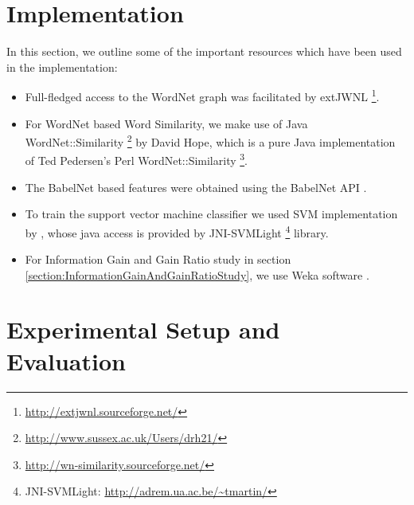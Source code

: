\section{Implementation}
In this section, we outline some of the important resources which have been used in the implementation: 
\begin{itemize}
\item Full-fledged access to the WordNet graph was facilitated by extJWNL \footnote{\url{http://extjwnl.sourceforge.net/}}.

\item For WordNet based Word Similarity, we make use of Java WordNet::Similarity \footnote{\url{http://www.sussex.ac.uk/Users/drh21/}} by David Hope, which is a pure Java implementation of Ted Pedersen's Perl WordNet::Similarity \footnote{\url{http://wn-similarity.sourceforge.net/}}.

\item The BabelNet based features were obtained using the BabelNet API \citep{NavigliPonzetto:2012acl}.

\item To train the support vector machine classifier we used SVM implementation by \citep{Joachims98makinglarge-scale}, whose java access is provided by JNI-SVMLight \footnote{JNI-SVMLight: \url{http://adrem.ua.ac.be/~tmartin/}} library.

\item For Information Gain and Gain Ratio study in section \ref{section:InformationGainAndGainRatioStudy}, we use Weka software \citep{wekaSoftware}.
\end{itemize}

\section{Experimental Setup and Evaluation}
\label{section:SupervisedExperimentalSetupAndEvaluation}
